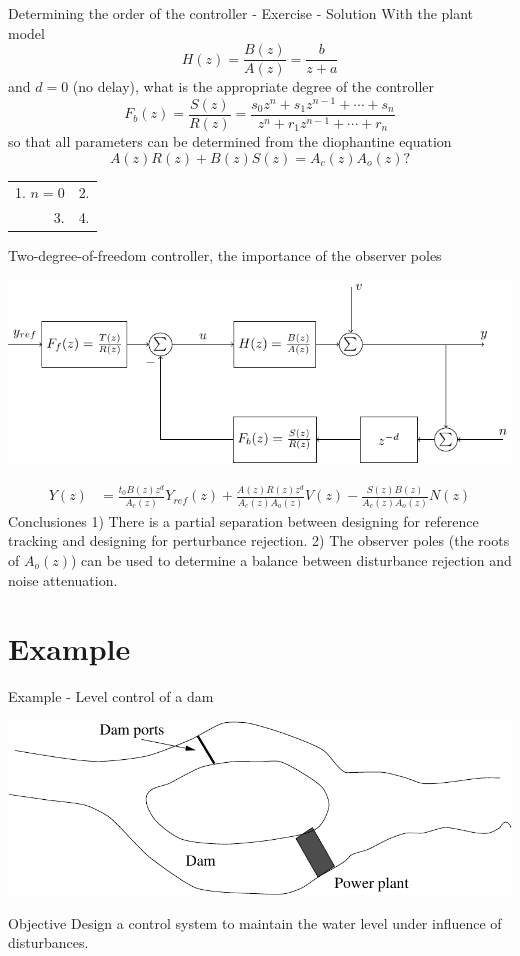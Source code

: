 \documentclass[presentation,aspectratio=169]{beamer}
\begin{document}
\begin{frame}[label={sec:org810c521}]{Determining the order of the controller - Exercise - Solution}
With the plant model \[H(z) = \frac{B(z)}{A(z)} = \frac{b}{z + a}\] and \(d=0\) (no delay), what is the appropriate degree of the controller \[F_b(z) = \frac{S(z)}{R(z)} = \frac{s_0z^n + s_1z^{n-1} + \cdots + s_n}{z^n + r_1 z^{n-1} + \cdots + r_n}\]
so that all parameters can be determined from the diophantine equation
\[ A(z)R(z) + B(z)S(z) = A_c(z)A_o(z)?\]
\begin{center}
\begin{tabular}{rr}
1. \(n = 0\) & 2.\\
3. & 4.\\
\end{tabular}
\end{center}
\end{frame}


\begin{frame}[label={sec:org4374619}]{Two-degree-of-freedom controller, the importance of the observer poles}
\begin{center}
\includegraphics[width=0.7\linewidth]{../../figures/2dof-block-explicit}
\end{center}
\begin{align*}
Y(z) &= \frac{t_0B(z)z^d}{A_c(z)}Y_{ref}(z) + \frac{A(z)R(z)z^d}{A_c(z)A_o(z)}V(z)- \frac{S(z)B(z)}{A_c(z)A_o(z)}N(z)
\end{align*}
\alert{Conclusiones} 1) There is a partial separation between designing for reference tracking and designing for perturbance rejection. 2) The observer poles (the roots of \(A_o(z)\)) can be used to determine a balance between disturbance rejection and noise attenuation.
\end{frame}




\section{Example}
\label{sec:org9c65b0f}
\begin{frame}[label={sec:org569c3db}]{Example - Level control of a dam}
\begin{center}
\includegraphics[width=0.5\linewidth]{../../figures/kraftverk}
\end{center}

\alert{Objective} Design a control system to maintain the water level under influence of disturbances.
\end{frame}
\end{document}
